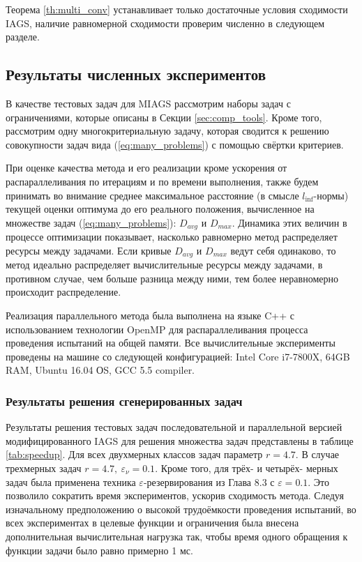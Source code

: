 Теорема \ref{th:multi_conv} устанавливает только достаточные условия сходимости IAGS, наличие равномерной сходимости проверим численно
в следующем разделе.

\subsection{Результаты численных экспериментов}

В качестве тестовых задач для MIAGS рассмотрим наборы задач с ограничениями, которые описаны в Секции \ref{sec:comp_tools}.
Кроме того, рассмотрим одну многокритериальную задачу, которая сводится к решению совокупности задач вида (\ref{eq:many_problems})
с помощью свёртки критериев.

При оценке качества метода и его реализации кроме ускорения от распараллеливания по итерациям и по времени выполнения,
также будем принимать во внимание среднее максимальное расстояние (в смысле \(l_{\inf}\)-нормы) текущей оценки оптимума до его реального положения,
вычисленное на множестве задач (\ref{eq:many_problems}): \(D_{avg}\) и \(D_{max}\). Динамика этих величин в процессе оптимизации
показывает, насколько равномерно метод распределяет ресурсы между задачами. Если кривые \(D_{avg}\) и \(D_{max}\) ведут себя одинаково, то
метод идеально распределяет вычислительные ресурсы между задачами, в противном случае, чем больше разница между
ними, тем более неравномерно происходит распределение.

Реализация параллельного метода была выполнена на языке C++ с использованием технологии OpenMP
для распараллеливания процесса проведения испытаний на общей памяти. Все вычислительные
эксперименты проведены на машине со следующей конфигурацией: Intel Core i7-7800X, 64GB RAM, Ubuntu 16.04 ОS, GCC 5.5 compiler.

\subsubsection{Результаты решения сгенерированных задач}

Результаты решения тестовых задач последовательной и параллельной версией модифицированного IAGS
для решения множества задач представлены в таблице \ref{tab:speedup}. Для всех двухмерных классов задач параметр \(r=4.7\).
В случае трехмерных задач \(r=4.7,\: \varepsilon_\nu=0.1\).
Кроме того, для трёх- и четырёх- мерных задач была применена техника \(\varepsilon\)-резервирования из \cite{Strongin2000} Глава 8.3 с
\(\varepsilon=0.1\). Это позволило сократить время экспериментов, ускорив сходимость метода.
Следуя изначальному предположению о высокой трудоёмкости проведения испытаний,
во всех экспериментах в целевые функции и ограничения была внесена дополнительная вычислительная нагрузка так,
чтобы время одного обращения к функции задачи было равно примерно 1 мс.

